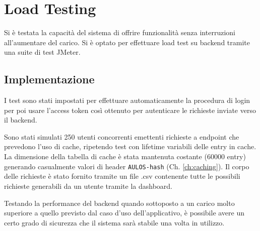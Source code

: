 \section{Load Testing}
\label{ch:stresstesting}
Si è testata la capacità del sistema di offrire funzionalità senza interruzioni all'aumentare del carico. 
Si è optato per effettuare load test su backend tramite una suite di test JMeter. \cite{JMETER}

\subsection{Implementazione}

I test sono stati impostati per effettuare automaticamente la procedura di login per poi usare l'access token così ottenuto per autenticare le richieste inviate verso il backend.

Sono stati simulati 250 utenti concorrenti emettenti richieste a endpoint che prevedono l'uso di cache, ripetendo test con lifetime variabili delle entry in cache.
La dimensione della tabella di cache è stata mantenuta costante (60000 entry) generando casualmente valori di header \verb|AULOS-hash| (Ch. \ref{ch:caching}).
Il corpo delle richieste è stato fornito tramite un file .csv contenente tutte le possibili richieste generabili da un utente tramite la dashboard.

Testando la performance del backend quando sottoposto a un carico molto superiore a quello previsto dal caso d'uso dell'applicativo, è possibile avere un certo grado di sicurezza che il sistema sarà stabile una volta in utilizzo.



